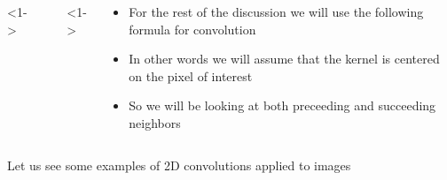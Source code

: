 \begin{frame}
	\begin{columns}
		<1->
		\begin{overlayarea}{\textwidth}{\textheight}
			\begin{minipage}[t]{0.25\textwidth}
			\end{minipage}
			        
			\begin{minipage}[t]{0.25\textwidth}
			\end{minipage}
			        
		\end{overlayarea}
		        
		<1->
		\begin{overlayarea}{\textwidth}{\textheight}
			\begin{itemize}
				\justifying
				\item<1-> For the rest of the discussion we will use the following formula for convolution
				\item<3-> In other words we will assume that the kernel is centered on the pixel of interest
				\item<4-> So we will be looking at both preceeding and succeeding neighbors 
			\end{itemize}
		\end{overlayarea}
	\end{columns}
\end{frame}


\begin{frame}
	\begin{center}
		Let us see some examples of 2D convolutions applied to images
	\end{center}
\end{frame}


